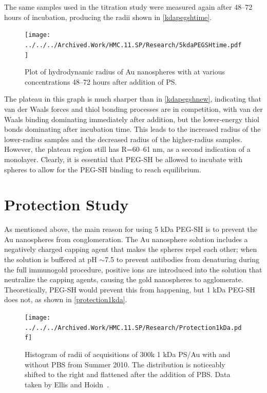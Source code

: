 The same samples used in the titration study were measured again after 48--72 hours of incubation, producing the radii shown in \autoref{kdapegshtime}.

\begin{figure}[htbp]
\centering
\texttt{[image: ../../../Archived.Work/HMC.11.SP/Research/5kdaPEGSHtime.pdf]}
\caption{Plot of hydrodynamic radius of Au nanospheres with at various concentrations 48--72 hours after addition of PS.}
\label{kdapegshtime}
\end{figure}



The plateau in this graph is much sharper than in \autoref{kdapegshnew}, indicating that van der Waals forces and thiol bonding processes are in competition, with van der Waals binding dominating immediately after addition, but the lower-energy thiol bonds dominating after incubation time. This leads to the increased radius of the lower-radius samples and the decreased radius of the higher-radius samples. However, the plateau region still has R=60--61 nm, as a second indication of a monolayer. Clearly, it is essential that PEG-SH be allowed to incubate with spheres to allow for the PEG-SH binding to reach equilibrium.

\section{Protection Study}
\label{protectionstudy}

As mentioned above, the main reason for using 5 kDa PEG-SH is to prevent the Au nanospheres from conglomeration. The Au nanosphere solution includes a negatively charged capping agent that makes the spheres repel each other; when the solution is buffered at pH \ensuremath{\sim}7.5 to prevent antibodies from denaturing during the full immunogold procedure, positive ions are introduced into the solution that neutralize the capping agents, causing the gold nanospheres to agglomerate. Theoretically, PEG-SH would prevent this from happening, but 1 kDa PEG-SH does not, as shown in \autoref{protection1kda}.

\begin{figure}[htbp]
\centering
\texttt{[image: ../../../Archived.Work/HMC.11.SP/Research/Protection1kDa.pdf]}
\caption{Histogram of radii of acquisitions of 300k 1 kDa PS\slash Au with and without PBS from Summer 2010. The distribution is noticeably shifted to the right and flattened after the addition of PBS. Data taken by Ellis and Hoidn~\citep{hoidnellis}.}
\label{protection1kda}
\end{figure}



